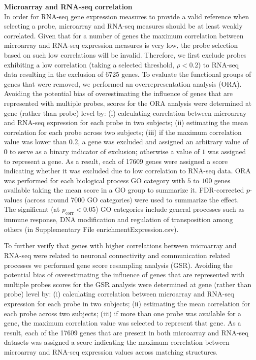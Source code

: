 \documentclass[10pt,A4]{article}
\begin{document}
\textbf{Microarray and RNA-seq correlation}\\
In order for RNA-seq gene expression measures to provide a valid reference when selecting a probe, microarray and RNA-seq measures should be at least weakly correlated. Given that for a number of genes the maximum correlation between microarray and RNA-seq expression measures is very low, the probe selection based on such low correlations will be invalid. Therefore, we first exclude probes exhibiting a low correlation (taking a selected threshold, $\rho < 0.2$) to RNA-seq data resulting in the exclusion of \num{6725} genes. To evaluate the functional groups of genes that were removed, we performed an overrepresentation analysis (ORA). Avoiding the potential bias of overestimating the influence of genes that are represented with multiple probes, scores for the ORA analysis were determined at gene (rather than probe) level by: (i) calculating correlation between microarray and RNA-seq expression for each probe in two subjects; (ii) estimating the mean correlation for each probe across two subjects; (iii) if the maximum correlation value was lower than $0.2$, a gene was excluded and assigned an arbitrary value of $0$ to serve as a binary indicator of exclusion; otherwise a value of $1$ was assigned to represent a gene. As a result, each of \num{17609} genes were assigned a score indicating whether it was excluded due to low correlation to RNA-seq data. ORA was performed for each biological process GO category with $5$ to $100$ genes available taking the mean score in a GO group to summarize it. FDR-corrected $p$-values (across around \num{7000} GO categories) were used to summarize the effect. The significant (at $p_\mathrm{corr}<0.05$) GO categories include general processes such as immune response, DNA modification and regulation of transposition among others (in Supplementary File enrichmentExpression.csv).

To further verify that genes with higher correlations between microarray and RNA-seq were related to neuronal connectivity and communication related processes we performed gene score resampling analysis (GSR). Avoiding the potential bias of overestimating the influence of genes that are represented with multiple probes scores for the GSR analysis were determined at gene (rather than probe) level by: (i) calculating correlation between microarray and RNA-seq expression for each probe in two subjects; (ii) estimating the mean correlation for each probe across two subjects; (iii) if more than one probe was available for a gene, the maximum correlation value was selected to represent that gene. As a result, each of the \num{17609} genes that are present in both microarray and RNA-seq datasets was assigned a score indicating the maximum correlation between microarray and RNA-seq expression values across matching structures. 
\end{document}
